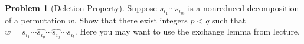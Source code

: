 \documentclass{amsart}
\newcommand{\+}[1]{\ensuremath{\mathbf{#1}}}
\theoremstyle{definition}
\newtheorem{prob}{Problem}
\begin{document}
\begin{prob}[Deletion Property]
 Suppose $s_{i_1} \cdots s_{i_m}$ is a nonreduced decomposition of a permutation $w$.
 Show that there exist integers $p < q$ such that
 $w = s_{i_1} \cdots \hat{s_{i_p}} \cdots \hat{s_{i_q}} \cdots s_{i_l}$.
 Here you may want to use the exchange lemma from lecture.
\end{prob}
\end{document}
